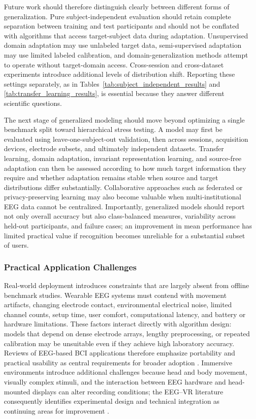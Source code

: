 \documentclass{WileyMSP-template}
\begin{document}
Future work should therefore distinguish clearly between different forms of generalization. Pure subject-independent evaluation should retain complete separation between training and test participants and should not be conflated with algorithms that access target-subject data during adaptation. Unsupervised domain adaptation may use unlabeled target data, semi-supervised adaptation may use limited labeled calibration, and domain-generalization methods attempt to operate without target-domain access. Cross-session and cross-dataset experiments introduce additional levels of distribution shift. Reporting these settings separately, as in Tables~\ref{tab:subject_independent_results} and \ref{tab:transfer_learning_results}, is essential because they answer different scientific questions.

The next stage of generalized modeling should move beyond optimizing a single benchmark split toward hierarchical stress testing. A model may first be evaluated using leave-one-subject-out validation, then across sessions, acquisition devices, electrode subsets, and ultimately independent datasets. Transfer learning, domain adaptation, invariant representation learning, and source-free adaptation can then be assessed according to how much target information they require and whether adaptation remains stable when source and target distributions differ substantially. Collaborative approaches such as federated or privacy-preserving learning may also become valuable when multi-institutional EEG data cannot be centralized. Importantly, generalized models should report not only overall accuracy but also class-balanced measures, variability across held-out participants, and failure cases; an improvement in mean performance has limited practical value if recognition becomes unreliable for a substantial subset of users.

\subsubsection{Practical Application Challenges}
\label{subsubsec:practical_application_challenges}

Real-world deployment introduces constraints that are largely absent from offline benchmark studies. Wearable EEG systems must contend with movement artifacts, changing electrode contact, environmental electrical noise, limited channel counts, setup time, user comfort, computational latency, and battery or hardware limitations. These factors interact directly with algorithm design: models that depend on dense electrode arrays, lengthy preprocessing, or repeated calibration may be unsuitable even if they achieve high laboratory accuracy. Reviews of EEG-based BCI applications therefore emphasize portability and practical usability as central requirements for broader adoption \cite{varbu2022bciapplications}. Immersive environments introduce additional challenges because head and body movement, visually complex stimuli, and the interaction between EEG hardware and head-mounted displays can alter recording conditions; the EEG--VR literature consequently identifies experimental design and technical integration as continuing areas for improvement \cite{choi2023immersivevr}.
\end{document}
